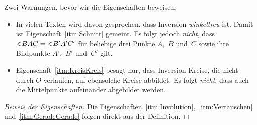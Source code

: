 Zwei Warnungen, bevor wir die Eigenschaften beweisen:
\begin{itemize}[\Warnung]
	\item In vielen Texten wird davon gesprochen, dass Inversion \emph{winkeltreu} ist. Damit ist Eigenschaft~\ref{itm:Schnitt} gemeint. Es folgt jedoch \emph{nicht}, dass $\winkel BAC=\winkel B'A'C'$ für beliebige drei Punkte $A$,~$B$ und~$C$ sowie ihre Bildpunkte $A'$,~$B'$ und~$C'$ gilt.
	\item Eigenschaft~\ref{itm:KreisKreis} besagt nur, dass Inversion Kreise, die nicht durch $O$ verlaufen, auf ebensolche Kreise abbildet. Es folgt \emph{nicht}, dass auch die Mittelpunkte aufeinander abgebildet werden.
\end{itemize}

\begin{proof}[Beweis der Eigenschaften]
	Die Eigenschaften~\ref{itm:Involution},~\ref{itm:Vertauschen} und~\ref{itm:GeradeGerade} folgen direkt aus der Definition.
	

\end{proof}
